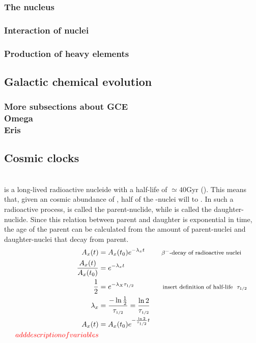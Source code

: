 \subsubsection{The nucleus}
\subsubsection{Interaction of nuclei}
\subsubsection{Production of heavy elements}

\subsection{Galactic chemical evolution}
\subsubsection{More subsections about GCE \\ Omega \\ Eris}

\subsection{Cosmic clocks}
\\
 is a long-lived radioactive nucleide with a half-life of $\simeq40$Gyr (). This means that, given an cosmic abundance of , half of the -nuclei will \betadecay to . In such a radioactive process,  is called the parent-nuclide, while  is called the daughter-nuclide. Since this relation between parent and daughter is exponential in time, the age of the parent can be calculated from the amount of parent-nuclei and daughter-nuclei that decay from parent.
\begin{align*}
  A_x(t) &= A_x(t_0) e^{-\lambda_x t} 
  \qquad \text{ \footnotesize
      \betadecay of radioactive nuclei
  } \\
  \frac{A_x(t)}{A_x(t_0)} &= e^{-\lambda_x t} \\
  \frac{1}{2} &= e^{-\lambda_X \halflife}
  \qquad\qquad \text{\footnotesize 
      insert definition of half-life \halflife} \\
  \lambda_x &= \frac{-\ln\frac{1}{2}}{\halflife}
  = \frac{\ln 2}{\halflife} \\
  A_x(t) &= A_x(t_0) e^{-\frac{\ln 2}{\halflife} t} \\
  \comment{add description of variables}
\end{align*}
